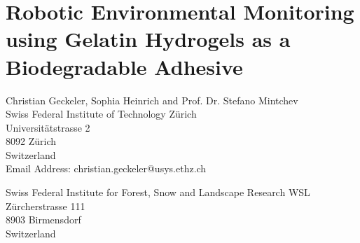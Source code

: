 \chapter[Gelatin Hydrogels as Biodegradable Adhesives]{Robotic Environmental Monitoring using Gelatin Hydrogels as a Biodegradable Adhesive}
\label{ch:OG}

\author{Christian Geckeler*}
\author{Sophia Heinrich}
\author{Stefano Mintchev}

\begin{affiliations}
\noindent
Christian Geckeler, Sophia Heinrich and Prof. Dr. Stefano Mintchev\\
Swiss Federal Institute of Technology Zürich\\
Universitätstrasse 2\\
8092 Zürich\\
Switzerland\\
Email Address: christian.geckeler@usys.ethz.ch\\ %
\par

\noindent
Swiss Federal Institute for Forest, Snow and Landscape Research WSL\\
Zürcherstrasse 111\\
8903 Birmensdorf\\
Switzerland
\end{affiliations}








